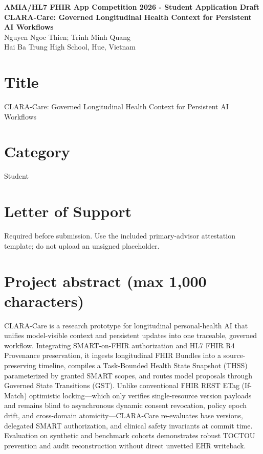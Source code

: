 \documentclass[10pt,letterpaper]{article}
\begin{document}
\begin{center}
{\Large\bfseries AMIA/HL7 FHIR App Competition 2026 - Student Application Draft}\\[4pt]
{\large\bfseries CLARA-Care: Governed Longitudinal Health Context for Persistent AI Workflows}\\[3pt]
Nguyen Ngoc Thien; Trinh Minh Quang\\
Hai Ba Trung High School, Hue, Vietnam
\end{center}

\section{Title}
CLARA-Care: Governed Longitudinal Health Context for Persistent AI Workflows

\section{Category}
Student

\section{Letter of Support}
Required before submission. Use the included primary-advisor attestation template; do not upload an unsigned placeholder.

\section{Project abstract (max 1,000 characters)}
CLARA-Care is a research prototype for longitudinal personal-health AI that unifies model-visible context and persistent updates into one traceable, governed workflow. Integrating SMART-on-FHIR authorization and HL7 FHIR R4 Provenance preservation, it ingests longitudinal FHIR Bundles into a source-preserving timeline, compiles a Task-Bounded Health State Snapshot (THSS) parameterized by granted SMART scopes, and routes model proposals through Governed State Transitions (GST). Unlike conventional FHIR REST ETag (If-Match) optimistic locking---which only verifies single-resource version payloads and remains blind to asynchronous dynamic consent revocation, policy epoch drift, and cross-domain atomicity---CLARA-Care re-evaluates base versions, delegated SMART authorization, and clinical safety invariants at commit time. Evaluation on synthetic and benchmark cohorts demonstrates robust TOCTOU prevention and audit reconstruction without direct unvetted EHR writeback.
\end{document}
